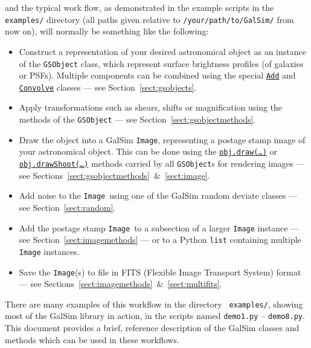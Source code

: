 \documentclass[preprint,11pt]{../../devel/modules/aastex}
\begin{document}
and the typical work flow, as demonstrated in the example scripts in the {\tt
examples/} directory (all paths given relative to
\texttt{/your/path/to/GalSim/} from now on), will normally
be something like the following:
\begin{itemize}

\item Construct a representation of your desired astronomical object
  as an instance of the {\tt GSObject} class, which represent surface brightness profiles (of galaxies or PSFs).  Multiple components can be
  combined using the special
  \href{http://galsim-developers.github.com/GalSim/classgalsim_1_1base_1_1_add.html}{\texttt{Add}}
  and 
  \href{http://galsim-developers.github.com/GalSim/classgalsim_1_1base_1_1_convolve.html}{\texttt{Convolve}}
  classes --- see Section~\ref{sect:gsobjects}.
\item Apply transformations such as shears, shifts or magnification
  using the methods of the \texttt{GSObject} --- see Section~\ref{sect:gsobjectmethods}.
\item Draw the object into a GalSim \texttt{Image}, representing a postage
  stamp image of your astronomical object.  This can be done using the
  \href{http://galsim-developers.github.com/GalSim/classgalsim_1_1base_1_1_g_s_object.html#ae0b346a8b438dedbc7f60a52220869d8}{\texttt{obj.draw(\dots)}}
  or
  \href{http://galsim-developers.github.com/GalSim/classgalsim_1_1base_1_1_g_s_object.html#a42ac334d2840ba3fa832988e998beca0}{\texttt{obj.drawShoot(\dots)}}
  methods carried by all \texttt{GSObject}s for rendering images --- see
  Sections~\ref{sect:gsobjectmethods}~\&~\ref{sect:image}.
\item Add noise to the \texttt{Image}~using one of the GalSim
  random deviate classes --- see Section~\ref{sect:random}.
\item Add the postage stamp \texttt{Image}~to a subsection of a larger
  \texttt{Image} 
  instance --- see
  Section~\ref{sect:imagemethods} --- or to a Python
  \texttt{list} containing multiple \texttt{Image} instances.
\item Save the \texttt{Image}(s) to file in FITS (Flexible Image Transport
  System) format --- see Sections~\ref{sect:imagemethods}~\&~\ref{sect:multifits}.
\end{itemize}

There are many examples of this workflow in the directory {\tt
 examples/}, showing most of the GalSim library in action, in
the scripts named \texttt{demo1.py} -- \texttt{demo8.py}.  This
document provides a brief, reference description of the GalSim classes
and methods which can be used in these workflows.
\end{document}
